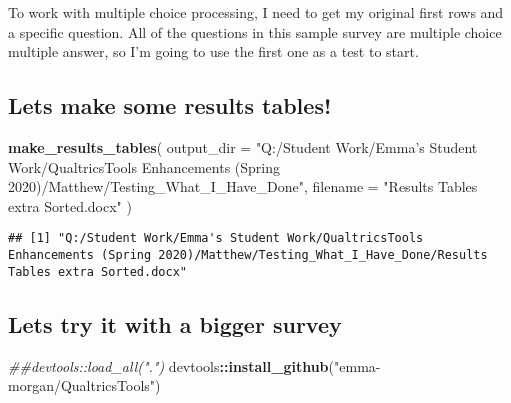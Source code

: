 \documentclass[
]{article}
\newenvironment{Shaded}{\begin{snugshade}}{\end{snugshade}}
\newcommand{\CommentTok}[1]{\textcolor[rgb]{0.56,0.35,0.01}{\textit{#1}}}
\newcommand{\DataTypeTok}[1]{\textcolor[rgb]{0.13,0.29,0.53}{#1}}
\newcommand{\DecValTok}[1]{\textcolor[rgb]{0.00,0.00,0.81}{#1}}
\newcommand{\KeywordTok}[1]{\textcolor[rgb]{0.13,0.29,0.53}{\textbf{#1}}}
\newcommand{\NormalTok}[1]{#1}
\newcommand{\OperatorTok}[1]{\textcolor[rgb]{0.81,0.36,0.00}{\textbf{#1}}}
\newcommand{\StringTok}[1]{\textcolor[rgb]{0.31,0.60,0.02}{#1}}
\begin{document}
To work with multiple choice processing, I need to get my original first
rows and a specific question. All of the questions in this sample survey
are multiple choice multiple answer, so I'm going to use the first one
as a test to start.

\begin{Shaded}
\end{Shaded}

\hypertarget{lets-make-some-results-tables}{%
\subsection{Lets make some results
tables!}\label{lets-make-some-results-tables}}

\begin{Shaded}
\begin{Highlighting}[]
\KeywordTok{make_results_tables}\NormalTok{(}
  \DataTypeTok{output_dir =} \StringTok{"Q:/Student Work/Emma's Student Work/QualtricsTools Enhancements (Spring 2020)/Matthew/Testing_What_I_Have_Done"}\NormalTok{,}
  \DataTypeTok{filename =} \StringTok{"Results Tables extra Sorted.docx"}
\NormalTok{)}
\end{Highlighting}
\end{Shaded}

\begin{verbatim}
## [1] "Q:/Student Work/Emma's Student Work/QualtricsTools Enhancements (Spring 2020)/Matthew/Testing_What_I_Have_Done/Results Tables extra Sorted.docx"
\end{verbatim}

\hypertarget{lets-try-it-with-a-bigger-survey}{%
\subsection{Lets try it with a bigger
survey}\label{lets-try-it-with-a-bigger-survey}}

\begin{Shaded}
\begin{Highlighting}[]
\CommentTok{##devtools::load_all(".")}
\NormalTok{devtools}\OperatorTok{::}\KeywordTok{install_github}\NormalTok{(}\StringTok{"emma-morgan/QualtricsTools"}\NormalTok{)}
\end{Highlighting}
\end{Shaded}
\end{document}
